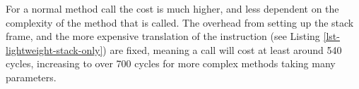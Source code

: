 For a normal method call the cost is much higher, and less dependent on the complexity of the method that is called. The overhead from setting up the stack frame, and the more expensive translation of the  instruction (see Listing \ref{lst-lightweight-stack-only}) are fixed, meaning a call will cost at least around 540 cycles, increasing to over 700 cycles for more complex methods taking many parameters.

%  
%  
%  
